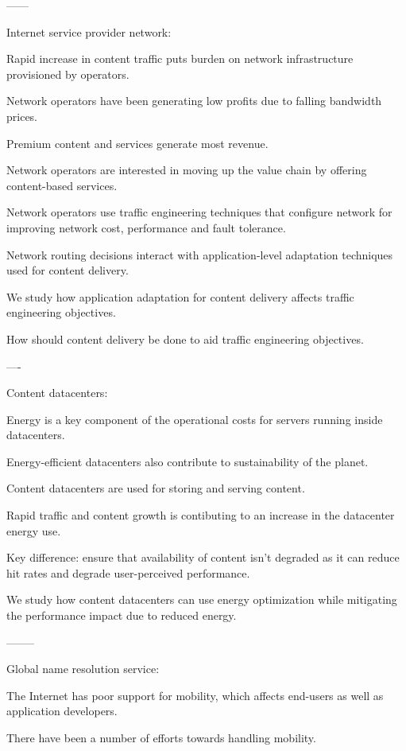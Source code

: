 ------

Internet service provider network:

Rapid increase in content traffic puts burden on network infrastructure provisioned by operators.

Network operators have been generating low profits due to falling bandwidth prices.

Premium content and services generate most revenue.

Network operators are interested in moving up the value chain by offering content-based services.

Network operators use traffic engineering techniques that configure network for improving network cost, performance and fault tolerance.

Network routing decisions interact with application-level adaptation techniques used for content delivery.

We study how application adaptation for content delivery affects traffic engineering objectives.

How should content delivery be done to aid traffic engineering objectives.

----

Content datacenters:

Energy is a key component of the operational costs for servers running inside datacenters.

Energy-efficient datacenters also contribute to sustainability of the planet.

Content datacenters are used for storing and serving content. 

Rapid traffic and content growth is contibuting to an increase in the datacenter energy use.

Key difference: ensure that availability of content isn't degraded as it can reduce hit rates and degrade user-perceived performance. 

We study how content datacenters can use energy optimization while mitigating the performance impact due to reduced energy.

--------

Global name resolution service:

The Internet has poor support for mobility, which affects end-users as well as application developers.

There have been a number of efforts towards handling mobility.

